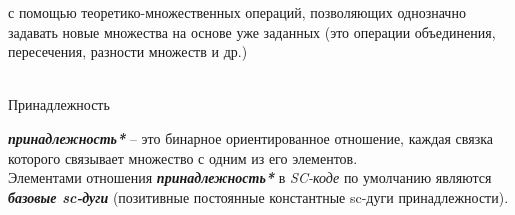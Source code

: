 \begin{frame}%
	
	\begin{textitemize}
	\item с помощью теоретико-множественных операций, позволяющих однозначно задавать новые множества на основе уже заданных (это операции объединения, пересечения, разности множеств и др.)
	\end{textitemize}

\vspace{2em}


\vspace{0.2em}
 

 
    
	\vspace{-4em}
\end{frame}

\begin{frame}{\\Принадлежность}
	\topline
	\justifying
	\begin{SCn}
	\end{SCn}
	
	\textbf{\textit{принадлежность*}} – это бинарное ориентированное отношение, каждая связка которого связывает множество с одним из его элементов.\\
	\bigskip
	Элементами отношения \textbf{\textit{принадлежность*}} в \textit{SC-коде} по умолчанию являются \textbf{\textit{базовые sc-дуги}} (позитивные постоянные константные sc-дуги принадлежности).
\end{frame}

